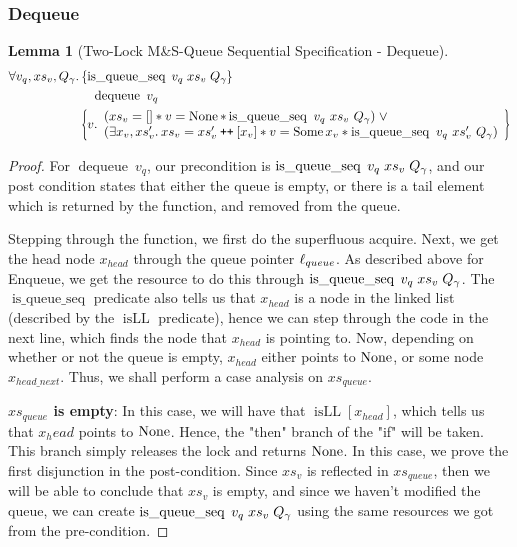\documentclass[a4paper, 11pt]{report}
\newtheorem{lemma}[theorem]{Lemma}
\newcommand{\dequeue}{\operatorname{dequeue}}
\newcommand{\tlmsq}{Two-Lock M\&S-Queue\xspace}
\newcommand{\isqueueseq}{\operatorname{is\_queue\_seq}}
\newcommand{\isLL}{\operatorname{isLL}}
\newcommand\catenate{\mathbin{\text{\ttfamily\upshape ++}}}
\newcommand{\tlseqspecdeq}{\All v_q, xs_v, Q_\gname. \hoareV[t]{\isqueueseq \; v_q \; xs_v \; Q_\gname}{\dequeue\ v_q}{v . \begin{array}{l}(xs_v = [] \star v = \None \star \isqueueseq\ v_q\ xs_v\ Q_\gname) \; \lor\\ (\Exists x_v, xs_v' . xs_v = xs_v' \catenate [x_v] \star v = \Some x_v \star \isqueueseq\ v_q\ xs_v'\ Q_\gname) \end{array}}}
\begin{document}
\subsubsection{Dequeue}
\begin{lemma}[\tlmsq Sequential Specification - Dequeue]\label{TLMSQ:spec:seq:dequeue}
  \begin{equation*}
    \tlseqspecdeq
  \end{equation*}
\end{lemma}
\begin{proof}
For $\dequeue\ v_q$, our precondition is $\isqueueseq \; v_q \; xs_v \; Q_\gname$, and our post condition states that either the queue is empty, or there is a tail element which is returned by the function, and removed from the queue.

Stepping through the function, we first do the superfluous acquire. Next, we get the head node $x_{head}$ through the queue pointer $\ell_{queue}$. As described above for Enqueue, we get the resource to do this through $\isqueueseq \; v_q \; xs_v \; Q_\gname$. The $\isqueueseq$ predicate also tells us that $x_{head}$ is a node in the linked list (described by the $\isLL$ predicate), hence we can step through the code in the next line, which finds the node that $x_{head}$ is pointing to. Now, depending on whether or not the queue is empty, $x_{head}$ either points to $\operatorname{None}$, or some node $x_{head\_next}$. Thus, we shall perform a case analysis on $xs_{queue}$.

\textbf{$xs_{queue}$ is empty}: In this case, we will have that $\isLL [x_{head}]$, which tells us that $x_head$ points to $\operatorname{None}$. Hence, the "then" branch of the "if" will be taken. This branch simply releases the lock and returns $\operatorname{None}$. In this case, we prove the first disjunction in the post-condition. Since $xs_v$ is reflected in $xs_{queue}$, then we will be able to conclude that $xs_v$ is empty, and since we haven't modified the queue, we can create $\isqueueseq \; v_q \; xs_v \; Q_\gname$ using the same resources we got from the pre-condition.


\end{proof}
\end{document}
